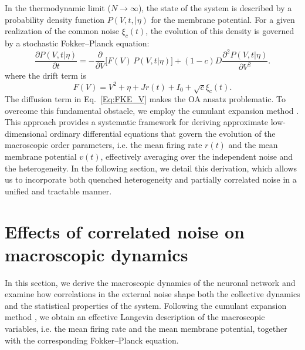 \documentclass[aps,twocolumn,pre]{revtex4-2}
\begin{document}
In the thermodynamic limit ($N \to \infty$), the state of the system is described by a probability density function $P(V,t,|\eta)$ for the membrane potential. For a given realization of the common noise $\xi_c(t)$, the evolution of this density is governed by a stochastic Fokker–Planck equation:
\begin{equation}
\frac{\partial P(V, t | \eta)}{\partial t}
= -\frac{\partial}{\partial V}\big[F(V) \, P(V, t | \eta)\big]
+ (1-c)D \frac{\partial^2 P(V, t | \eta)}{\partial V^2}.
\label{Eq:FKE_V}
\end{equation}
where the drift term is
\begin{equation}
F(V) = V^2+\eta + J r(t) + I_0 + \sqrt{c}\xi_c(t).
\end{equation}
The diffusion term in Eq.~\eqref{Eq:FKE_V} makes the OA ansatz problematic. To overcome this fundamental obstacle, we employ the cumulant expansion method \cite{tyulkina2018dynamics,goldobin2021reduction}. This approach provides a systematic framework for deriving approximate low-dimensional ordinary differential equations that govern the evolution of the macroscopic order parameters, i.e. the mean firing rate $r(t)$ and the mean membrane potential $v(t)$, effectively averaging over the independent noise and the heterogeneity. In the following section, we detail this derivation, which allows us to incorporate both quenched heterogeneity and partially correlated noise in a unified and tractable manner.

\section{Effects of correlated noise on macroscopic dynamics}
In this section, we derive the macroscopic dynamics of the neuronal network and examine how correlations in the external noise shape both the collective dynamics and the statistical properties of the system. Following the cumulant expansion method \cite{goldobin2021reduction}, we obtain an effective Langevin description of the macroscopic variables, i.e. the mean firing rate and the mean membrane potential, together with the corresponding Fokker–Planck equation.
\end{document}
